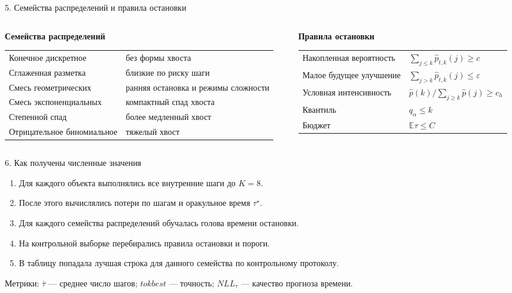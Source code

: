 \documentclass[aspectratio=169,11pt]{beamer}
\newcommand{\smallnote}[1]{{\color{mutedText}\small #1}}
\begin{document}
\begin{frame}{5. Семейства распределений и правила остановки}
\small
\begin{columns}[T,onlytextwidth]
\begin{column}{0.50\textwidth}
\textbf{Семейства распределений}
\vspace{1mm}

\begin{tabularx}{\textwidth}{@{}p{}Y@{}}
\toprule
Конечное дискретное & без формы хвоста \\
Сглаженная разметка & близкие по риску шаги \\
Смесь геометрических & ранняя остановка и режимы сложности \\
Смесь экспоненциальных & компактный спад хвоста \\
Степенной спад & более медленный хвост \\
Отрицательное биномиальное & тяжелый хвост \\
\bottomrule
\end{tabularx}
\end{column}
\begin{column}{0.46\textwidth}
\textbf{Правила остановки}
\vspace{1mm}

\begin{tabularx}{\textwidth}{@{}p{}Y@{}}
\toprule
Накопленная вероятность & $\sum_{j\le k}\widehat p_{t,k}(j)\ge c$ \\
Малое будущее улучшение & $\sum_{j>k}\widehat p_{t,k}(j)\le \varepsilon$ \\
Условная интенсивность & $\widehat p(k)/\sum_{j\ge k}\widehat p(j)\ge c_h$ \\
Квантиль & $q_\alpha\le k$ \\
Бюджет & $\mathbb E\tau\le C$ \\
\bottomrule
\end{tabularx}
\end{column}
\end{columns}
\end{frame}

\begin{frame}{6. Как получены численные значения}
\begin{enumerate}\setlength\itemsep{2.3mm}
\item Для каждого объекта выполнялись все внутренние шаги до $K=8$.
\item После этого вычислялись потери по шагам и оракульное время $\tau^\star$.
\item Для каждого семейства распределений обучалась голова времени остановки.
\item На контрольной выборке перебирались правила остановки и пороги.
\item В таблицу попадала лучшая строка для данного семейства по контрольному протоколу.
\end{enumerate}

\vspace{2mm}
\smallnote{Метрики: $\bar\tau$ — среднее число шагов; $\textit{tokbest}$ — точность; $NLL_\tau$ —
качество прогноза времени.}
\end{frame}
\end{document}
